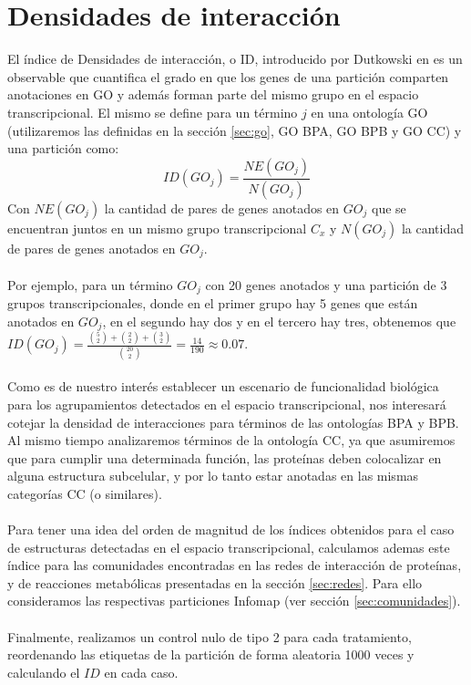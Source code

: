 \section{Densidades de interacción}
El índice de Densidades de interacción, o ID, introducido por Dutkowski en \cite{Dutkowski2013} es un observable que cuantifica el grado en que los genes de una partición comparten anotaciones en GO y además forman parte del mismo grupo en el espacio transcripcional. El mismo se define para un término $j$ en una ontología GO (utilizaremos las definidas en la sección \ref{sec:go}, GO BPA, GO BPB y GO CC) y una partición como:
\begin{equation}
	ID(GO_j) = \frac{NE(GO_j)}{N(GO_j)}
\end{equation}
Con $NE(GO_j)$ la cantidad de pares de genes anotados en $GO_j$ que se encuentran juntos en un mismo grupo transcripcional $C_x$ y $N(GO_j)$ la cantidad de pares de genes anotados en $GO_j$.\\\\
Por ejemplo, para un término $GO_j$ con 20 genes anotados y una partición de 3 grupos transcripcionales, donde en el primer grupo hay 5 genes que están anotados en $GO_j$, en el segundo hay dos y en el tercero hay tres, obtenemos que $ID(GO_j) = \frac{\binom{5}{2}+\binom{2}{2}+\binom{3}{2}}{\binom{20}{2}}=\frac{14}{190}\approx 0.07$.\\\\
Como es de nuestro interés establecer un escenario de funcionalidad biológica para los agrupamientos detectados en el espacio transcripcional, nos interesará cotejar la densidad de interacciones para términos de las ontologías BPA y BPB. Al mismo tiempo analizaremos términos de la ontología CC, ya que asumiremos que para cumplir una determinada función, las proteínas deben colocalizar en alguna estructura subcelular, y por lo tanto estar anotadas en las mismas categorías CC (o similares).\\\\
Para tener una idea del orden de magnitud de los índices obtenidos para el caso de estructuras detectadas en el espacio transcripcional, calculamos ademas este índice para las comunidades encontradas en las redes de interacción de proteínas, y de reacciones metabólicas presentadas en la sección \ref{sec:redes}. Para ello consideramos las respectivas particiones Infomap (ver sección \ref{sec:comunidades}).\\\\
Finalmente, realizamos un control nulo de tipo 2 para cada tratamiento, reordenando las etiquetas de la partición de forma aleatoria 1000 veces y calculando el $ID$ en cada caso.\\\\
